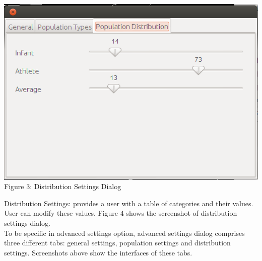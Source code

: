 \documentclass[a4paper,10pt]{article}
\begin{document}
\begin{center}
\includegraphics[scale=0.5]{distributionSettingsGUI.png}
\\Figure 3: Distribution Settings Dialog
\end{center}

Distribution Settings: provides a user with a table of categories and their values. User can modify these values. 
Figure 4 shows the screenshot of distribution settings dialog.
\\

To be specific in advanced settings option, advanced settings dialog comprises three different tabs: general settings, population settings 
and distribution settings. Screenshots above show the interfaces of these tabs. \\




\end{document}

